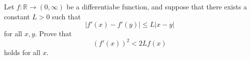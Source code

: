 Let $f:\mathbb R\to(0,\infty)$ be a differentiabe function, and suppose that there exists a constant $L>0$ such that
$$|f'(x)-f'(y)|\leq L|x-y|$$for all $x,y$. Prove that
$$(f'(x))^2<2Lf(x)$$holds for all $x$.